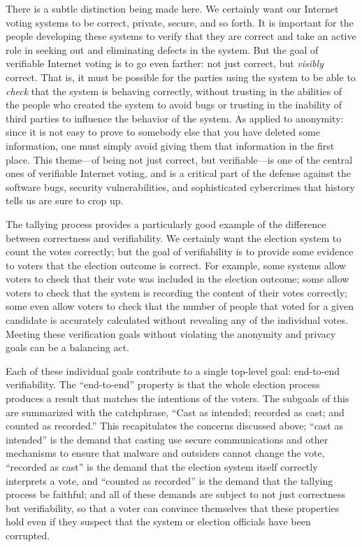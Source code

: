There is a subtle distinction being made here. We certainly want our
Internet voting systems to be correct, private, secure, and so forth. It is
important for the people developing these systems to verify that they are
correct and take an active role in seeking out and eliminating defects in
the system. But the goal of verifiable Internet voting is to go even
farther: not just correct, but \emph{visibly} correct. That is, it must be
possible for the parties using the system to be able to \emph{check} that
the system is behaving correctly, without trusting in the abilities of the
people who created the system to avoid bugs or trusting in the inability of
third parties to influence the behavior of the system. As applied to
anonymity: since it is not easy to prove to somebody else that you have
deleted some information, one must simply avoid giving them that information
in the first place. This theme---of being not just correct, but
verifiable---is one of the central ones of verifiable Internet voting, and
is a critical part of the defense against the software bugs, security
vulnerabilities, and sophisticated cybercrimes that history tells us are
sure to crop up.

The tallying process provides a particularly good example of the difference
between correctness and verifiability. We certainly want the election system
to count the votes correctly; but the goal of verifiability is to provide
some evidence to voters that the election outcome is correct. For example,
some systems allow voters to check that their vote was included in the
election outcome; some allow voters to check that the system is recording
the content of their votes correctly; some even allow voters to check that
the number of people that voted for a given candidate is accurately
calculated without revealing any of the individual votes. Meeting these
verification goals without violating the anonymity and privacy goals can be
a balancing act.

Each of these individual goals contribute to a single top-level goal:
end-to-end verifiability. The ``end-to-end'' property is that the whole
election process produces a result that matches the intentions of the
voters. The subgoals of this are summarized with the catchphrase, ``Cast as
intended; recorded as cast; and counted as recorded.'' This recapitulates
the concerns discussed above; ``cast as intended'' is the demand that
casting use secure communications and other mechanisms to ensure that
malware and outsiders cannot change the vote, ``recorded as cast'' is the
demand that the election system itself correctly interprets a vote, and
``counted as recorded'' is the demand that the tallying process be faithful;
and all of these demands are subject to not just correctness but
verifiability, so that a voter can convince themselves that these properties
hold even if they suspect that the system or election officials have been
corrupted.

